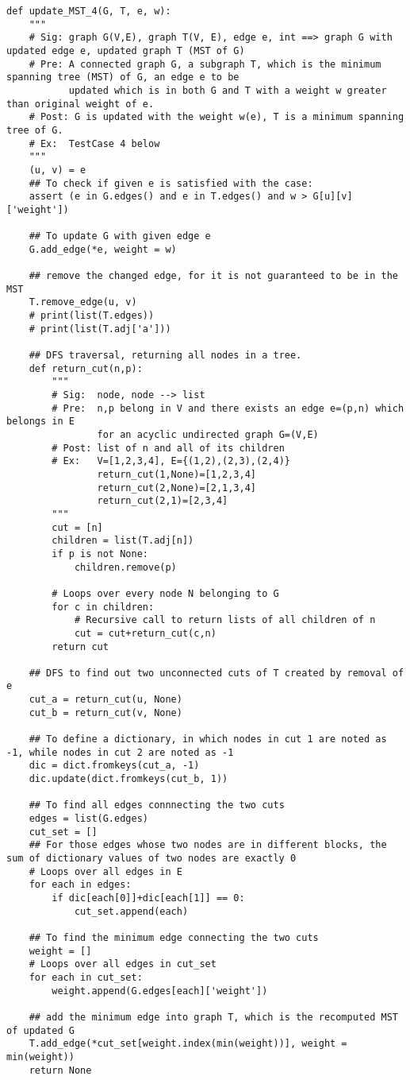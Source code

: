 \documentclass[a4paper,11pt]{article}
\begin{document}
\begin{lstlisting}
def update_MST_4(G, T, e, w):
    """
    # Sig: graph G(V,E), graph T(V, E), edge e, int ==> graph G with updated edge e, updated graph T (MST of G)
    # Pre: A connected graph G, a subgraph T, which is the minimum spanning tree (MST) of G, an edge e to be
           updated which is in both G and T with a weight w greater than original weight of e.
    # Post: G is updated with the weight w(e), T is a minimum spanning tree of G.
    # Ex:  TestCase 4 below
    """
    (u, v) = e
    ## To check if given e is satisfied with the case:
    assert (e in G.edges() and e in T.edges() and w > G[u][v]['weight'])

    ## To update G with given edge e
    G.add_edge(*e, weight = w)

    ## remove the changed edge, for it is not guaranteed to be in the MST
    T.remove_edge(u, v)
    # print(list(T.edges))
    # print(list(T.adj['a']))

    ## DFS traversal, returning all nodes in a tree.
    def return_cut(n,p):
    	"""
    	# Sig:  node, node --> list
    	# Pre:  n,p belong in V and there exists an edge e=(p,n) which belongs in E
    		    for an acyclic undirected graph G=(V,E)
    	# Post: list of n and all of its children
    	# Ex:   V=[1,2,3,4], E={(1,2),(2,3),(2,4)}
    			return_cut(1,None)=[1,2,3,4]
    			return_cut(2,None)=[2,1,3,4]
    			return_cut(2,1)=[2,3,4]
    	"""
        cut = [n]
        children = list(T.adj[n])
        if p is not None:
            children.remove(p)

        # Loops over every node N belonging to G
        for c in children:
        	# Recursive call to return lists of all children of n
            cut = cut+return_cut(c,n)
        return cut

    ## DFS to find out two unconnected cuts of T created by removal of e
    cut_a = return_cut(u, None)
    cut_b = return_cut(v, None)

    ## To define a dictionary, in which nodes in cut 1 are noted as -1, while nodes in cut 2 are noted as -1
    dic = dict.fromkeys(cut_a, -1)
    dic.update(dict.fromkeys(cut_b, 1))

    ## To find all edges connnecting the two cuts
    edges = list(G.edges)
    cut_set = []
    ## For those edges whose two nodes are in different blocks, the sum of dictionary values of two nodes are exactly 0
    # Loops over all edges in E
    for each in edges:
        if dic[each[0]]+dic[each[1]] == 0:
            cut_set.append(each)

    ## To find the minimum edge connecting the two cuts
    weight = []
    # Loops over all edges in cut_set
    for each in cut_set:
        weight.append(G.edges[each]['weight'])

    ## add the minimum edge into graph T, which is the recomputed MST of updated G
    T.add_edge(*cut_set[weight.index(min(weight))], weight = min(weight))
    return None
\end{lstlisting}
\end{document}
